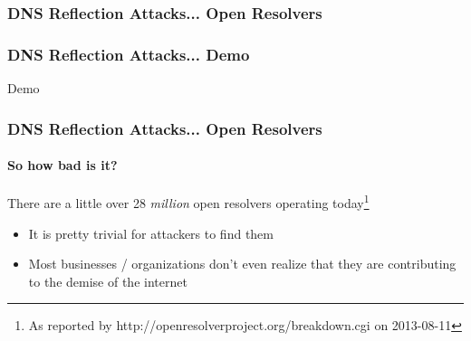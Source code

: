 \documentclass{beamer}
\begin{document}
\begin{frame}[fragile]
	\frametitle{DNS Reflection Attacks... Open Resolvers}
\end{frame}

\begin{frame}
	\frametitle{DNS Reflection Attacks... Demo}
	\begin{center}
		\vspace*{\fill}
		{\Large Demo}
		\vspace*{\fill}
	\end{center}
\end{frame}

\begin{frame}
	\frametitle{DNS Reflection Attacks... Open Resolvers}
		\framesubtitle{So how bad is it?}
		There are a little over 28 {\em million} open resolvers operating
		today\footnote{ As reported by http://openresolverproject.org/breakdown.cgi on
		2013-08-11}
		\begin{itemize}
			\item It is pretty trivial for attackers to find them
			\item Most businesses / organizations don't even realize that they are
				contributing to the demise of the internet
		\end{itemize}
\end{frame}
\end{document}
